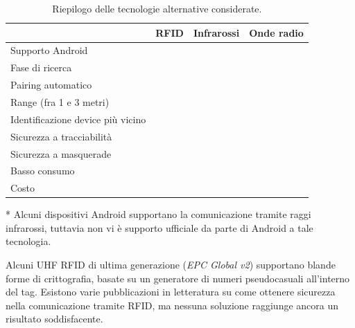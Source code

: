 \documentclass[a4paper,12pt]{report}
\newcommand{\cmark}{\ding{51}}
\newcommand{\xmark}{\ding{55}}
\begin{document}
\begin{table}[H]
	\centering
	\begin{threeparttable}
		\begin{tabular}{|
				>{\centering}m{} |
				>{\centering}m{} |
				>{\centering}m{} |
				>{\centering}m{} |}
			\hline
			& RFID & Infrarossi & Onde radio \tabularnewline
			\hline
			Supporto Android & \xmark & \xmark \tnote{*} & \xmark \tabularnewline
			\hline
			Fase di ricerca & \cmark & \xmark & \cmark \tabularnewline
			\hline
			Pairing automatico & \cmark & \cmark & \cmark \tabularnewline
			\hline
			Range (fra 1 e 3 metri) & \cmark & \cmark & \cmark \tabularnewline
			\hline
			Identificazione device più vicino & \xmark & \xmark & \xmark \tabularnewline
			\hline
			Sicurezza a tracciabilità & \xmark \tnote{\dag} & \cmark & \cmark \tabularnewline
			\hline
			Sicurezza a masquerade & \xmark \tnote{\dag} & \cmark & \cmark \tabularnewline
			\hline
			Basso consumo & \cmark & \xmark & \xmark \tabularnewline
			\hline
			Costo & \xmark & \xmark & \xmark \tabularnewline
			\hline
		\end{tabular}
		\begin{tablenotes} \footnotesize
			\item[*] Alcuni dispositivi Android supportano la comunicazione tramite raggi infrarossi, tuttavia non vi è supporto ufficiale da parte di Android a tale tecnologia.
			\item[\dag] Alcuni UHF RFID di ultima generazione (\emph{EPC Global v2}) supportano blande forme di crittografia, basate su un generatore di numeri pseudocasuali all'interno del tag. Esistono varie pubblicazioni in letteratura su come ottenere sicurezza nella comunicazione tramite RFID, ma nessuna soluzione raggiunge ancora un risultato soddisfacente. 
		\end{tablenotes}
		\caption{Riepilogo delle tecnologie alternative considerate.}
		\label{tectable-other}
	\end{threeparttable}
\end{table}
\end{document}
